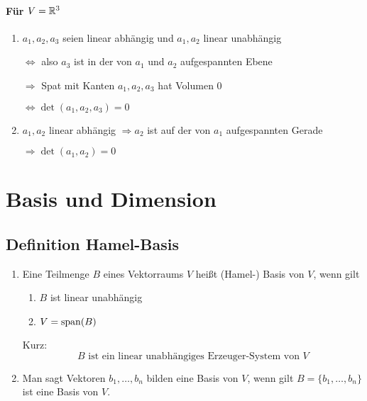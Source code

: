 \paragraph{Für $V = \mathbb{R}^3$}
\begin{enumerate}[label= (\alph*)]
    \item $a_1, a_2, a_3$ seien linear abhängig und $a_1, a_2$ linear unabhängig

        $\Leftrightarrow$ also $a_3$ ist in der von $a_1$ und $a_2$ aufgespannten
        Ebene

        $\Rightarrow$ Spat mit Kanten $a_1, a_2, a_3$ hat Volumen $0$

        $\Leftrightarrow \det(a_1, a_2, a_3) = 0$
    \item $a_1, a_2$ linear abhängig $\Rightarrow a_2$ ist auf der von $a_1$
        aufgespannten Gerade

        $\Rightarrow \det(a_1, a_2) = 0$
\end{enumerate}

\section{Basis und Dimension}
\subsection{Definition Hamel-Basis}
\begin{enumerate}[label= (\alph*)]
    \item Eine Teilmenge $B$ eines Vektorraums $V$ heißt (Hamel-) Basis von $V$,
        wenn gilt
        \begin{enumerate}[label= (\roman*)]
            \item $B$ ist linear unabhängig
            \item $V = \operatorname{span}(B)$
        \end{enumerate}
        Kurz:
        \begin{equation*}
            B \text{ ist ein linear unabhängiges Erzeuger-System
            von }V
        \end{equation*}
    \item Man sagt Vektoren $b_1, \ldots, b_n$ bilden eine Basis von $V$, wenn
        gilt $B=\{b_1, \ldots, b_n\}$ ist eine Basis von $V$.
\end{enumerate}
